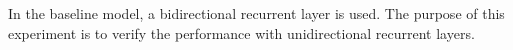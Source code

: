 
In the baseline model, a bidirectional recurrent layer is
used. The purpose of this experiment is to verify the
performance with unidirectional recurrent layers.
